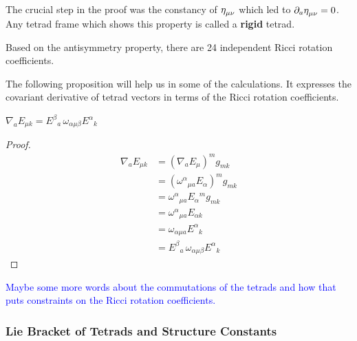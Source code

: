 The crucial step in the proof was the constancy of $ \tt{ \eta}{}{ \mu \nu}$ which led to $ \partial_a \tt{ \eta}{}{ \mu \nu}=0$. Any tetrad frame which shows this property is called a \textbf{rigid} tetrad. 
	

Based on the antisymmetry property, there are 24 independent Ricci rotation coefficients. 

The following proposition will help us in some of the calculations. It expresses the covariant derivative of tetrad vectors in terms of the Ricci rotation coefficients.




\begin{proposition}
$\nabla_a E_{\mu k} = E^{\beta}{}_a\, \omega_{\alpha\mu\beta} E^{\alpha}{}_k $
\end{proposition}

\begin{proof}\begin{align*}
\nabla_a E_{\mu k} &= \left( \nabla_a E_\mu \right)^m g_{mk} \\
&= \left( \omega^{\alpha}{}_{\mu a} E_\alpha \right)^m g_{mk} \\
&= \omega^{\alpha}{}_{\mu a} E_\alpha{}^m g_{mk} \\
&= \omega^{\alpha}{}_{\mu a} E_{\alpha k} \\
&= \omega_{\alpha\mu a} E^{\alpha}{}_k \\
&= E^{\beta}{}_a\, \omega_{\alpha\mu\beta} E^{\alpha}{}_k
\end{align*}

\end{proof}




\textcolor{blue}{Maybe some more words about the commutations of the tetrads and how that puts constraints on the Ricci rotation coefficients. }



\subsubsection{Lie Bracket of Tetrads and Structure Constants}


